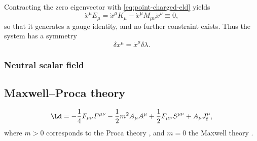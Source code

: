 \documentclass[a4paper,11pt]{article}
\begin{document}
Contracting the zero eigenvector with \cref{eq:point-charged-eld} yields
\begin{equation}
\dot{x}^\mu E_\mu = \dot{x}^\mu K_\mu - \dot{x}^\mu M_{\mu\nu} \ddot{x}^\nu
\equiv 0,
\end{equation}
so that it generates a gauge identity, and no further constraint exists. Thus 
the system has a symmetry
\begin{equation}
\delta x^\mu = \dot{x}^\mu \delta \lambda.
\end{equation}






\subsubsection{Neutral scalar field}
\cite[sec.\ 3.3]{Kiefer2012}

\subsection{Maxwell--Proca theory}

\begin{equation}
\Ld = -\frac{1}{4} F_{\mu\nu} F^{\mu\nu} - \frac{1}{2}m^2 A_\mu A^\mu + 
\frac{1}{2} F_{\mu\nu} S^{\mu\nu} + A_\mu J^\mu_\text{f},
\end{equation}
where $m > 0$ corresponds to the Proca theory \cite[sec.\ 2.3]{Gitman1990}, and 
$m = 0$ the Maxwell theory \cite[sec.\ 3.3.3]{Rothe2010} \cite[sec.\ 
2.4]{Gitman1990}.





\end{document}
